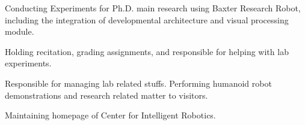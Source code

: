 \documentclass[10pt,a4paper]{altacv}
\begin{document}
\bigskip
{}

Conducting Experiments for Ph.D. main research using Baxter Research Robot, including the integration of developmental architecture and visual processing module.

\divider

Holding recitation, grading assignments, and responsible for helping with lab experiments.

\divider

Responsible for managing lab related stuffs. Performing humanoid robot demonstrations and research related matter to visitors.

\divider

Maintaining homepage of Center for Intelligent Robotics.

\divider





\nocite{*}

%

\printbibliography[heading=pubtype,title={\printinfo{\faFileTextO}{Journal Articles}}, type=article]

\divider

\printbibliography[heading=pubtype,title={\printinfo{\faGroup}{Conference Proceedings}},type=inproceedings]

\divider
\end{document}
